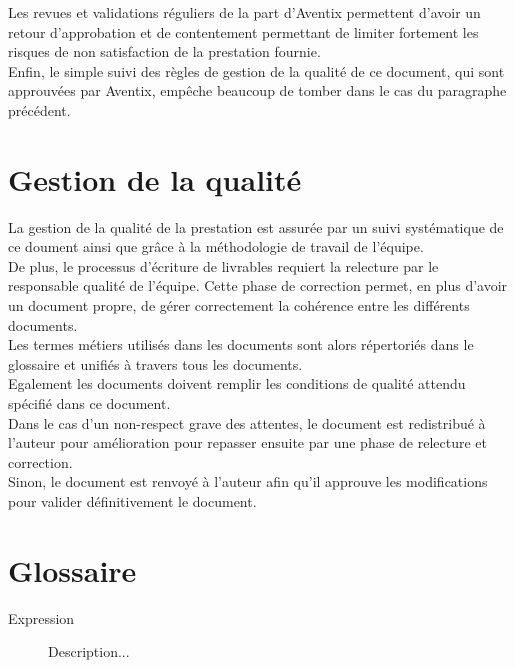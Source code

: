 \documentclass[11pt, a4paper]{article}
\begin{document}
Les revues et validations réguliers de la part d'Aventix permettent d'avoir un
retour d'approbation et de contentement permettant de limiter fortement les
risques de non satisfaction de la prestation fournie. \\

Enfin, le simple suivi des règles de gestion de la qualité de ce document, qui
sont approuvées par Aventix, empêche beaucoup de tomber dans le cas du
paragraphe précédent. \\

\section{Gestion de la qualité}
La gestion de la qualité de la prestation est assurée par un suivi systématique
de ce doument ainsi que grâce à la méthodologie de travail de l'équipe. \\

De plus, le processus d'écriture de livrables requiert la relecture par le
responsable qualité de l'équipe. Cette phase de correction permet, en plus
d'avoir un document propre, de gérer correctement la cohérence entre les
différents documents. \\

Les termes métiers utilisés dans les documents sont alors répertoriés dans le
glossaire et unifiés à travers tous les documents. \\
Egalement les documents doivent remplir les conditions de qualité attendu
spécifié dans ce document. \\

Dans le cas d'un non-respect grave des attentes, le document est redistribué à
l'auteur pour amélioration pour repasser ensuite par une phase de relecture et
correction. \\
Sinon, le document est renvoyé à l'auteur afin qu'il approuve les modifications
pour valider définitivement le document. \\

\section{Glossaire}

\begin{description}
  \item[Expression] Description...
\end{description}
\end{document}
